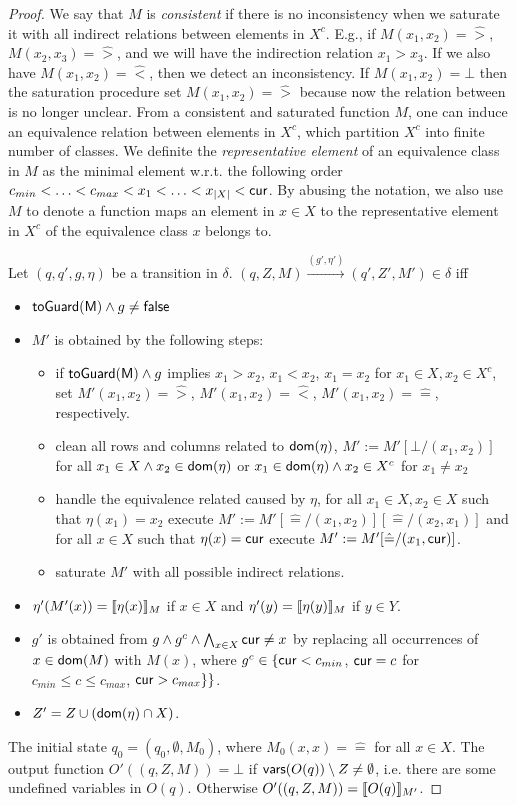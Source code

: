 \begin{appendix}
\begin{proof}
{We say that $M$ is \emph{consistent} if there is no inconsistency when we saturate it with all indirect relations between elements in $X^c$. E.g., if $M(x_1,x_2)=\hat{>}$, $M(x_2,x_3)=\hat{>}$, and we will have the indirection relation $x_1>x_3$. If we also have $M(x_1,x_2)=\hat{<}$, then we detect an inconsistency. If $M(x_1,x_2)=\bot$ then the saturation procedure set $M(x_1,x_2)=\hat{>}$ because now the relation between is no longer unclear. From a consistent and saturated function $M$, one can induce an equivalence relation between elements in $X^c$, which partition $X^c$ into finite number of classes. We definite the \emph{representative element} of an equivalence class in $M$ as the minimal element w.r.t. the following order $c_{min}<\ldots<c_{max}<x_1<\ldots<x_{|X|}<\mathsf{cur}$. By abusing the notation, we also use $M$ to denote a function maps an element in $x\in X$ to the representative element in $X^c$ of the equivalence class $x$ belongs to.


Let $(q,q',g,\eta)$ be a transition in $\delta$. 
$(q,Z,M) \xrightarrow{(g',\eta')} (q',Z', M') \in \delta$ iff
\begin{itemize}
\item $\mathsf{toGuard(M)}\wedge g \neq \mathsf{false}$
\item $M'$ is obtained by the following steps: 
  \begin{itemize}
    \item if $\mathsf{toGuard(M)}\wedge g$ implies $x_1>x_2$, $x_1<x_2$, $x_1=x_2$ for $x_1\in X, x_2\in X^c$, set $M'(x_1,x_2)=\hat{>}$, $M'(x_1,x_2)=\hat{<}$, $M'(x_1,x_2)=\hat{=}$, respectively.
	\item clean all rows and columns related to $\mathsf{dom}(\eta)$, $M':=M'[\bot/(x_1,x_2)]$ for all $x_1\in X\wedge x_2 \in \mathsf{dom}(\eta)$ or $x_1 \in \mathsf{dom}(\eta) \wedge x_2\in X^c$ for $x_1\neq x_2$ 
	\item handle the equivalence related caused by $\eta$, for all $x_1\in X,x_2\in X$ such that $\eta(x_1)=x_2$ execute $M':=M'[\hat{=}/(x_1,x_2)][\hat{=}/(x_2,x_1)]$ and for all $x\in X$ such that $\eta(x)=\mathsf{cur}$ execute $M':=M'[\hat{=}/(x_1,\mathsf{cur})]$.
	\item saturate $M'$ with all possible indirect relations. 
  \end{itemize}
\item $\eta'(M'(x))= \llbracket\eta(x)\rrbracket_{M}$ if $x \in X$ and  $\eta'(y)= \llbracket\eta(y)\rrbracket_{M}$ if $y\in Y$.
\item $g'$ is obtained from $g\wedge g^c \wedge \bigwedge_{x \in X} \mathsf{cur} \neq x$ by replacing all occurrences of $x\in\mathsf{dom}(M)$ with $M(x)$, where $g^c\in \{\mathsf{cur} < c_{min}$, $\mathsf{cur} = c$ for $c_{min} \le c \le c_{max}$, $\mathsf{cur} > c_{max}\}\}$. 
\item $Z'= Z\cup (\mathsf{dom}(\eta)\cap X)$.
\end{itemize}
%
The initial state $q_0 = (q_0, \emptyset, M_0)$, where $M_0(x,x) = \hat{=}$ for all $x\in X$.
The output function $O'((q,Z,M))=\bot$ if $\mathsf{vars}(O(q)) \setminus Z\neq \emptyset$, i.e. there are some undefined variables in $O(q)$. Otherwise $O'((q,Z,M))=\llbracket O(q)\rrbracket_{M'}$.
}
\end{proof}



\end{appendix}
